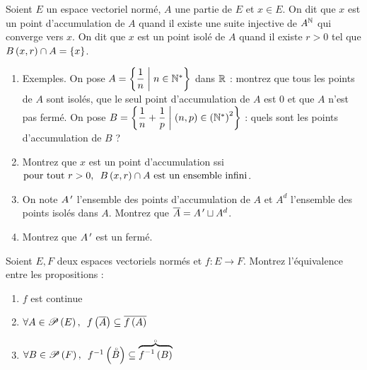 \begin{exoss}[Exercice 18]
Soient \(E\) un espace vectoriel normé, \(A\) une partie de \(E\) et \(x\in E\). On dit que \(x\) est un point d'accumulation de \(A\) quand il existe une suite injective de \(A^{\mathbb{N}}\) qui converge vers \(x\). On dit que \(x\) est un point isolé de \(A\) quand il existe \(r>0\) tel que \(B\left(x,r\right)\cap A=\left\lbrace x\right\rbrace\).

\begin{enumerate}
    \item Exemples. On pose \(A=\left\lbrace\dfrac{1}{n}\;\middle|\; n\in\mathbb{N}^*\right\rbrace\) dans \(\mathbb{R}\) : montrez que tous les points de \(A\) sont isolés, que le seul point d'accumulation de \(A\) est \(0\) et que \(A\) n'est pas fermé. On pose \(B=\left\lbrace\dfrac{1}{n}+\dfrac{1}{p}\;\middle|\;\left(n,p\right)\in\left(\mathbb{N}^*\right)^2\right\rbrace\) : quels sont les points d'accumulation de \(B\) ? \\
    \item Montrez que \(x\) est un point d'accumulation ssi \(\quantifs{\tpt r>0}\bouleo{x}{r}\inter A\text{ est un ensemble infini}\). \\
    \item On note \(A^{\,\prime}\) l'ensemble des points d'accumulation de \(A\) et \(A^d\) l'ensemble des points isolés dans \(A\). Montrez que \(\overline{A}=A^{\,\prime}\sqcup A^d\). \\
    \item Montrez que \(A^{\,\prime}\) est un fermé.
\end{enumerate}
\end{exoss}

\begin{corr}
\end{corr}

\begin{exoss}[Exercice 19]
Soient \(E,F\) deux espaces vectoriels normés et \(f:E\to F\). Montrez l'équivalence entre les propositions :

\begin{enumerate}
    \item \(f\) est continue \\
    \item \(\quantifs{\forall A\in\P{E}}f\paren{\conj{A}}\subset\conj{f\paren{A}}\) \\
    \item \(\quantifs{\forall B\in\P{F}}f\inv\paren{\interieur{B}}\subset\interieur{\overbrace{f\inv\paren{B}}}\)
\end{enumerate}
\end{exoss}

